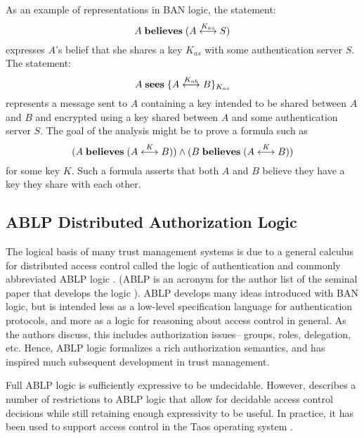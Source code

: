 As an example of representations in BAN logic, the statement:
\begin{displaymath}
A \;\textbf{believes}\; (A \stackrel{K_{as}}{\longleftrightarrow} S)
\end{displaymath}
expresses $A$'s belief that she shares a key $K_{as}$ with some
authentication server $S$. The statement:
\begin{displaymath}
A \;\textbf{sees}\; \{A \stackrel{K_{ab}}{\longleftrightarrow} B\}_{K_{as}}
\end{displaymath}
represents a message sent to $A$ containing a key intended to be
shared between $A$ and $B$ and encrypted using a key shared between
$A$ and some authentication server $S$. The goal of the analysis might
be to prove a formula such as
\begin{displaymath}
(A \;\textbf{believes}\; (A \stackrel{K}{\longleftrightarrow} B)) \wedge
(B \;\textbf{believes}\; (A \stackrel{K}{\longleftrightarrow} B))
\end{displaymath}
for some key $K$. Such a formula asserts that both $A$ and $B$ believe they
have a key they share with each other.

\subsection{ABLP Distributed Authorization Logic}

\ABLPinferencerulesfig

The logical basis of many trust management systems is due to a general
calculus for distributed access control called the logic of
authentication and commonly abbreviated ABLP logic
\cite{Abadi:CACDS}. (ABLP is an acronym for the author list of the
seminal paper that develops the logic \cite{Abadi:CACDS}).  ABLP
develops many ideas introduced with BAN logic, but is intended less as
a low-level specification language for authentication protocols, and
more as a logic for reasoning about access control in general.  As the
authors discuss, this includes authorization issues-- groups, roles,
delegation, etc.  Hence, ABLP logic formalizes a rich authorization
semantics, and has inspired much subsequent development in trust
management.

Full ABLP logic is sufficiently expressive to be undecidable. However,
\cite{Abadi:CACDS} describes a number of restrictions to ABLP logic
that allow for decidable access control decisions while still
retaining enough expressivity to be useful.  In practice, it has
been used to support access control in the Taos operating system
\cite{Wobber:ATOS}. 

